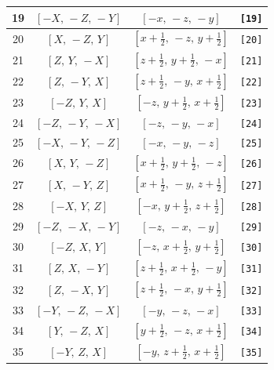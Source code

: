 \documentclass[fleqn,8pt]{jsarticle}
\begin{document}
\begin{longtable}{cccc}
19 & $\left[ - X,\, - Z,\, - Y \right]$ & $\left[ - x,\, - z,\, - y \right]$ & {\tt [19]} \\ \hline
20 & $\left[ X,\, - Z,\, Y \right]$ & $\left[ x + \frac{1}{2},\, - z,\, y + \frac{1}{2} \right]$ & {\tt [20]} \\ \hline
21 & $\left[ Z,\, Y,\, - X \right]$ & $\left[ z + \frac{1}{2},\, y + \frac{1}{2},\, - x \right]$ & {\tt [21]} \\ \hline
22 & $\left[ Z,\, - Y,\, X \right]$ & $\left[ z + \frac{1}{2},\, - y,\, x + \frac{1}{2} \right]$ & {\tt [22]} \\ \hline
23 & $\left[ - Z,\, Y,\, X \right]$ & $\left[ - z,\, y + \frac{1}{2},\, x + \frac{1}{2} \right]$ & {\tt [23]} \\ \hline
24 & $\left[ - Z,\, - Y,\, - X \right]$ & $\left[ - z,\, - y,\, - x \right]$ & {\tt [24]} \\ \hline
25 & $\left[ - X,\, - Y,\, - Z \right]$ & $\left[ - x,\, - y,\, - z \right]$ & {\tt [25]} \\ \hline
26 & $\left[ X,\, Y,\, - Z \right]$ & $\left[ x + \frac{1}{2},\, y + \frac{1}{2},\, - z \right]$ & {\tt [26]} \\ \hline
27 & $\left[ X,\, - Y,\, Z \right]$ & $\left[ x + \frac{1}{2},\, - y,\, z + \frac{1}{2} \right]$ & {\tt [27]} \\ \hline
28 & $\left[ - X,\, Y,\, Z \right]$ & $\left[ - x,\, y + \frac{1}{2},\, z + \frac{1}{2} \right]$ & {\tt [28]} \\ \hline
29 & $\left[ - Z,\, - X,\, - Y \right]$ & $\left[ - z,\, - x,\, - y \right]$ & {\tt [29]} \\ \hline
30 & $\left[ - Z,\, X,\, Y \right]$ & $\left[ - z,\, x + \frac{1}{2},\, y + \frac{1}{2} \right]$ & {\tt [30]} \\ \hline
31 & $\left[ Z,\, X,\, - Y \right]$ & $\left[ z + \frac{1}{2},\, x + \frac{1}{2},\, - y \right]$ & {\tt [31]} \\ \hline
32 & $\left[ Z,\, - X,\, Y \right]$ & $\left[ z + \frac{1}{2},\, - x,\, y + \frac{1}{2} \right]$ & {\tt [32]} \\ \hline
33 & $\left[ - Y,\, - Z,\, - X \right]$ & $\left[ - y,\, - z,\, - x \right]$ & {\tt [33]} \\ \hline
34 & $\left[ Y,\, - Z,\, X \right]$ & $\left[ y + \frac{1}{2},\, - z,\, x + \frac{1}{2} \right]$ & {\tt [34]} \\ \hline
35 & $\left[ - Y,\, Z,\, X \right]$ & $\left[ - y,\, z + \frac{1}{2},\, x + \frac{1}{2} \right]$ & {\tt [35]} \\ \hline

\end{longtable}
\end{document}
